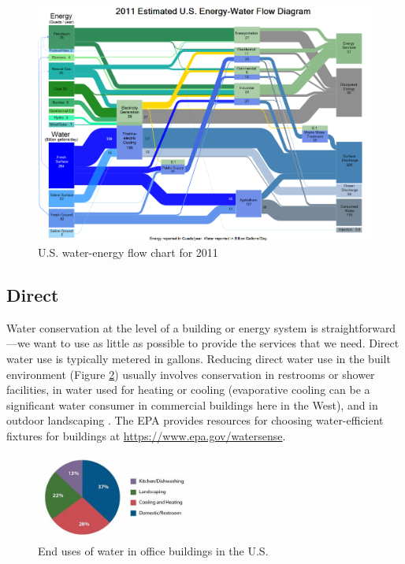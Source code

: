 \documentclass[10pt]{article}
\begin{document}
            \begin{figure}[h]
            \includegraphics[width=6.5in]{extras18/energy-watersankey.png}
            \caption{U.S. water-energy flow chart for 2011 \cite{waterenergynexus}}
            \label{sankey}
            \end{figure}



\subsection{Direct}


Water conservation at the level of a building or energy system is straightforward---we want to use as little as possible to provide the services that we need. Direct water use is typically metered in gallons. 
Reducing direct water use in the built environment (Figure \ref{weu}) usually involves conservation in restrooms or shower facilities, in water used for heating or cooling (evaporative cooling can be a significant water consumer in commercial buildings here in the West), and in outdoor landscaping \cite{noauthor_2012-sd}. The EPA provides resources for choosing water-efficient fixtures for buildings  at \url{https://www.epa.gov/watersense}.

\begin{figure}[h]
\centering
\includegraphics[width=2in]{extras18/weucb.jpg}
\caption{End uses of water in office buildings in the U.S. \cite{eGRIDsupportdoc2016}}
\label{weu}
\end{figure}
\end{document}

